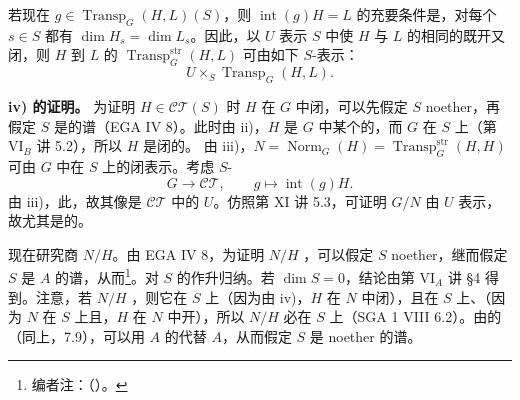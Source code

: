 若现在 $g\in\operatorname{Transp}_G(H,L)(S)$，则 $\operatorname{int}(g)H=L$ 的充要条件是，对每个 $s\in S$ 都有 $\dim H_s=\dim L_s$。因此，以 $U$ 表示 $S$ 中使 $H$ 与 $L$ 的相同的既开又闭，则 $H$ 到 $L$ 的 $\operatorname{Transp}^{\mathrm{str}}_G(H,L)$ 可由如下 $S$-表示：
\[U\times_S\operatorname{Transp}_G(H,L).\]

\textbf{iv) 的证明。} 为证明 $H\in\mathcal{CT}(S)$ 时 $H$ 在 $G$ 中闭，可以先假定 $S$  noether，再假定 $S$ 是的谱（EGA IV 8）。此时由 ii)，$H$ 是 $G$ 中某个的，而 $G$ 在 $S$ 上（第 VI$_B$ 讲 5.2），所以 $H$ 是闭的。
由 iii)，$N=\operatorname{Norm}_G(H)=\operatorname{Transp}^{\mathrm{str}}_G(H,H)$ 可由 $G$ 中在 $S$ 上的闭表示。考虑 $S$-
\[G\longrightarrow\mathcal{CT},\qquad g\longmapsto\operatorname{int}(g)H.\]
由 iii)，此，故其像是 $\mathcal{CT}$ 中的 $U$。仿照第 XI 讲 5.3，可证明 $G/N$ 由 $U$ 表示，故尤其是的。

现在研究商 $N/H$。由 EGA IV 8，为证明 $N/H$ ，可以假定 $S$  noether，继而假定 $S$ 是 $A$ 的谱，从而\footnote{编者注：（）。}。对 $S$ 的作升归纳。若 $\dim S=0$，结论由第 VI$_A$ 讲 \S4 得到。注意，若 $N/H$ ，则它在 $S$ 上（因为由 iv)，$H$ 在 $N$ 中闭），且在 $S$ 上、（因为 $N$ 在 $S$ 上且，$H$ 在 $N$ 中开），所以 $N/H$ 必在 $S$ 上（SGA 1 VIII 6.2）。由的（同上，7.9），可以用 $A$ 的代替 $A$，从而假定 $S$ 是 noether 的谱。

